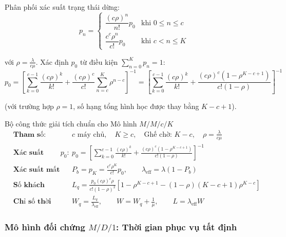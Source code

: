 Phân phối xác suất trạng thái dừng:
\begin{equation}
    p_n = \begin{cases}
        \dfrac{(c\rho)^n}{n!} p_0 & \text{khi } 0 \le n \le c \\[8pt]
        \dfrac{c^c \rho^n}{c!} p_0 & \text{khi } c < n \le K
    \end{cases}
\end{equation}

với $\rho = \frac{\lambda}{c\mu}$. Xác định $p_0$ từ điều kiện $\sum_{n=0}^K p_n = 1$:
\begin{equation}
    p_0 = \left[ \sum_{k=0}^{c-1} \frac{(c\rho)^k}{k!} + \frac{(c\rho)^c}{c!} \sum_{n=c}^K \rho^{n-c} \right]^{-1} = \left[ \sum_{k=0}^{c-1} \frac{(c\rho)^k}{k!} + \frac{(c\rho)^c (1 - \rho^{K-c+1})}{c!(1 - \rho)} \right]^{-1}
\end{equation}

(với trường hợp $\rho = 1$, số hạng tổng hình học được thay bằng $K - c + 1$).

\begin{modelbox}{Bộ công thức giải tích chuẩn cho Mô hình $M/M/c/K$}
\begin{align*}
    &\textbf{Tham số:} && c \text{ máy chủ}, \quad K \ge c, \quad \text{Ghế chờ: } K - c, \quad \rho = \frac{\lambda}{c\mu} \\[4pt]
    &\textbf{Xác suất rỗng } p_0\textbf{:} && p_0 = \left[ \sum_{k=0}^{c-1} \frac{(c\rho)^k}{k!} + \frac{(c\rho)^c(1 - \rho^{K-c+1})}{c!(1 - \rho)} \right]^{-1} \\[4pt]
    &\textbf{Xác suất mất gói:} && P_b = p_K = \frac{c^c \rho^K}{c!} p_0, \qquad \lambda_{\text{eff}} = \lambda(1 - P_b) \\[4pt]
    &\textbf{Số khách hàng đợi:} && L_q = \frac{p_0 (c\rho)^c \rho}{c!(1-\rho)^2} \left[ 1 - \rho^{K-c+1} - (1 - \rho)(K-c+1)\rho^{K-c} \right] \\[4pt]
    &\textbf{Chỉ số thời gian (Little):} && W_q = \frac{L_q}{\lambda_{\text{eff}}}, \qquad W = W_q + \frac{1}{\mu}, \qquad L = \lambda_{\text{eff}} W
\end{align*}
\end{modelbox}

\newpage

\subsubsection{Mô hình đối chứng \texorpdfstring{$M/D/1$}{M/D/1}: Thời gian phục vụ tất định}

